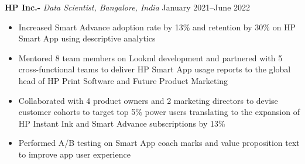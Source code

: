 \textbf{HP Inc.-} \textit{Data Scientist, Bangalore, India} \hfill January 2021--June 2022\par

\begin{itemize}
	\item Increased Smart Advance adoption rate by 13\% and retention by 30\% on HP Smart App using descriptive analytics
	\item Mentored 8 team members on Lookml development and partnered with 5 cross-functional teams to deliver HP Smart App usage reports to the global head of HP Print Software and Future Product Marketing
	\item Collaborated with 4 product owners and 2 marketing directors to devise customer cohorts to target top 5\% power users translating to the expansion of HP Instant Ink and Smart Advance subscriptions by 13\%
	\item Performed A/B testing on Smart App coach marks and value proposition text  to improve app user experience 
\end{itemize}\par